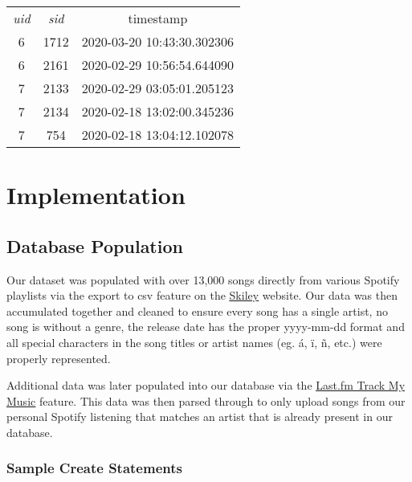 \documentclass[12pt]{article}
\begin{document}
    \begin{center}
        \begin{tabular}{ |c|c|c| }
            \hline
            \rowcolor{tablegrey} \multicolumn{3}{|c|}{Play} \\
            \hline
            \emph{uid} & \emph{sid} & timestamp \\
            \hline
            6 & 1712 & 2020-03-20 10:43:30.302306 \\
            \hline
            6 & 2161 & 2020-02-29 10:56:54.644090 \\
            \hline
            7 & 2133 & 2020-02-29 03:05:01.205123 \\
            \hline
            7 & 2134 & 2020-02-18 13:02:00.345236 \\
            \hline
            7 & 754 & 2020-02-18 13:04:12.102078 \\
            \hline
        \end{tabular}
    \end{center}



    \section{Implementation}

    \subsection{Database Population}
    Our dataset was populated with over 13,000 songs directly from various Spotify playlists
    via the export to csv feature on the \underline{\href{https://skiley.net/}{Skiley}} website.
    Our data was then accumulated together and cleaned to ensure every song has a single artist, no song
    is without a genre, the release date has the proper yyyy-mm-dd format and all special characters
    in the song titles or artist names (eg. \'{a}, \"{i}, \~{n}, etc.) were properly represented.

    \vspace{0.5cm}

    \noindent Additional data was later populated into our database via the
    \underline{\href{https://www.last.fm/about/trackmymusic}{Last.fm Track My Music}} feature. This data was
    then parsed through to only upload songs from our personal Spotify listening that matches an artist that
    is already present in our database.


    \subsubsection{Sample Create Statements}
\end{document}
